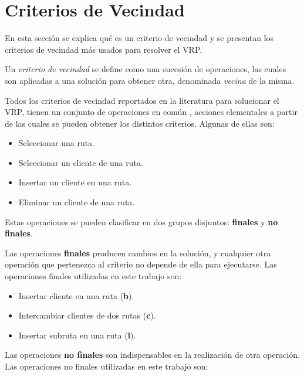 \documentclass[a4paper,10pt,twocolumn]{article}
\begin{document}
\section{Criterios de Vecindad}\label{sec:nbhCrit}

	En esta sección se explica qué es un criterio de vecindad y se presentan los 
	criterios de vecindad más usados para resolver el VRP.

  	Un \textit{criterio de vecindad} se define como una sucesión de operaciones, las
  	cuales son aplicadas a una solución para obtener otra, denominada \textit{vecina}
  	de la misma.

  	Todos los criterios de vecindad reportados en la literatura para solucionar el VRP,
  	\cite{Paolo, Alina} tienen un conjunto de operaciones en común \cite{Camila}, acciones elementales a 
  	partir de las cuales se pueden obtener los distintos criterios. Algunas de ellas son:
  	\begin{itemize}
  		\renewcommand{\labelitemi}{\tiny $\blacksquare$}
  		\item Seleccionar una ruta.
  		\item Seleccionar un cliente de una ruta.
  		\item Insertar un cliente en una ruta.
  		\item Eliminar un cliente de una ruta.
  	\end{itemize}

  	Estas operaciones se pueden clasificar en dos grupos disjuntos: \textbf{finales} y 
  	\textbf{no finales}.

	Las operaciones \textbf{finales} producen cambios en la solución, y cualquier 
	otra operación que pertenezca al criterio no depende de ella para ejecutarse. Las
	operaciones finales utilizadas en este trabajo son:
	
	\begin{itemize}
		\item Insertar cliente en una ruta (\textbf{b}).
		\item Intercambiar clientes de dos rutas (\textbf{c}).
		\item Insertar subruta en una ruta (\textbf{i}).
	\end{itemize}

	Las operaciones \textbf{no finales} son indispensables en la realización de otra
	operación. Las operaciones no finales utilizadas en este trabajo son:
	
\end{document}
